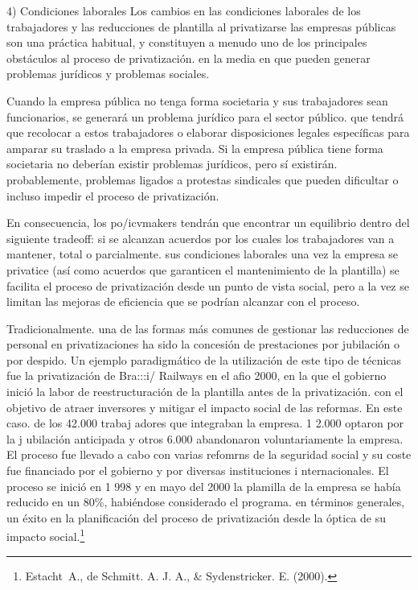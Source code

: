 \documentclass[10pt,a4paper]{article}
\begin{document}
4) Condiciones laborales
Los cambios en las condiciones laborales de los trabajadores y las reducciones de plantilla al privatizarse las empresas públicas son una práctica habitual, y constituyen a menudo uno de los principales obstáculos al proceso de privatización. en la media en que pueden generar problemas jurídicos y problemas sociales. 

Cuando la empresa pública no tenga forma societaria y sus trabajadores sean funcionarios, se generará un problema jurídico para el sector público. que tendrá que recolocar a estos trabajadores o elaborar disposiciones legales específicas para amparar su traslado a la empresa privada. Si la empresa pública tiene forma societaria no deberían existir problemas jurídicos, pero sí existirán. probablemente, problemas ligados a protestas sindicales que pueden dificultar o incluso impedir el proceso de privatización.

En consecuencia, los po/icvmakers tendrán que encontrar un equilibrio dentro del siguiente tradeoff: si se alcanzan acuerdos por los cuales los trabajadores van a mantener, total o parcialmente. sus condiciones laborales una vez la empresa se privatice (así como acuerdos que garanticen el mantenimiento de la plantilla) se facilita el proceso de privatización desde un punto de vista social, pero a la vez se limitan las mejoras de eficiencia que se podrían alcanzar con el proceso. 

Tradicionalmente. una de las formas más comunes de gestionar las reducciones de personal en privatizaciones ha sido la concesión de prestaciones por jubilación o por despido. Un ejemplo paradigmático de la utilización de este tipo de técnicas fue la privatización de Bra:::i/ Railways en el afio 2000, en la que el gobierno inició la labor de reestructuración de la plantilla antes de la privatización. con el objetivo de atraer inversores y mitigar el impacto social de las reformas. En este caso. de los 42.000 trabaj adores que integraban la empresa. 1 2.000 optaron por la j ubilación anticipada y otros 6.000 abandonaron voluntariamente la empresa. El proceso fue llevado a cabo con varias refomrns de la seguridad social y su coste fue financiado por el gobierno y por diversas instituciones i nternacionales. El proceso se inició en 1 998 y en mayo del 2000 la plamilla de la empresa se había reducido en un 80\%, habiéndose considerado el programa. en términos generales, un éxito en la planificación del proceso de privatización desde la óptica de su impacto social.\footnote{Estacht\ A., de Schmitt. A. J. A., \& Sydenstricker. E. (2000).
}
\end{document}
